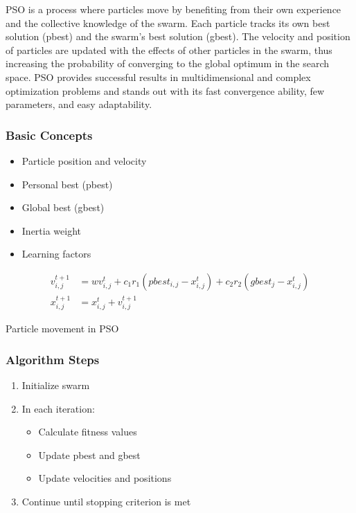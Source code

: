 PSO is a process where particles move by benefiting from their own experience and the collective knowledge of the swarm. Each particle tracks its own best solution (pbest) and the swarm's best solution (gbest). The velocity and position of particles are updated with the effects of other particles in the swarm, thus increasing the probability of converging to the global optimum in the search space. PSO provides successful results in multidimensional and complex optimization problems and stands out with its fast convergence ability, few parameters, and easy adaptability.

\subsubsection{Basic Concepts}
\begin{itemize}
    \item Particle position and velocity
    \item Personal best (pbest)
    \item Global best (gbest)
    \item Inertia weight
    \item Learning factors
\end{itemize}

\begin{equation}
\begin{aligned}
v_{i,j}^{t+1} &= w v_{i,j}^t + c_1r_1(pbest_{i,j} - x_{i,j}^t) + c_2r_2(gbest_j - x_{i,j}^t) \\
x_{i,j}^{t+1} &= x_{i,j}^t + v_{i,j}^{t+1}
\end{aligned}
\end{equation}

\begin{marginfigure}
\centering
{}
\caption{Particle movement in PSO}
\label{fig:pso_movement}
\end{marginfigure}

\subsubsection{Algorithm Steps}
\begin{enumerate}
    \item Initialize swarm
    \item In each iteration:
        \begin{itemize}
            \item Calculate fitness values
            \item Update pbest and gbest
            \item Update velocities and positions
        \end{itemize}
    \item Continue until stopping criterion is met
\end{enumerate}

